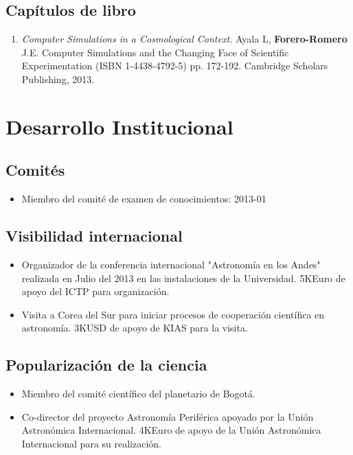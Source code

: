 \documentclass{article}
\begin{document}
\subsection*{Cap\'itulos de libro}
\begin{enumerate}
\item {\it Computer Simulations in a Cosmological Context.} Ayala L, {\bf Forero-Romero} J.E. Computer Simulations and the Changing Face of Scientific Experimentation (ISBN 1-4438-4792-5) pp. 172-192. Cambridge Scholars Publishing, 2013.
\end{enumerate}

\section*{Desarrollo Institucional}

\subsection*{Comit\'es}

\begin{itemize}
\item {Miembro del comit\'e de examen de conocimientos}: 2013-01
\end{itemize}

\subsection*{Visibilidad internacional}

\begin{itemize}
\item {Organizador de la conferencia internacional "Astronom\'ia en los
  Andes" realizada en Julio del 2013 en las instalaciones de la Universidad. 5KEuro de apoyo del ICTP para organizaci\'on.}
\item {Visita a Corea del Sur para iniciar procesos de cooperaci\'on
  cient\'ifica en astronom\'ia. 3KUSD de apoyo de KIAS para la visita.}
\end{itemize}

\subsection*{Popularizaci\'on de la ciencia}
\begin{itemize}
\item {Miembro del comit\'e cient\'ifico del planetario de Bogot\'a.}
\item {Co-director del proyecto Astronom\'ia Perif\'erica apoyado por
  la Uni\'on Astron\'omica Internacional. 4KEuro de apoyo de la Uni\'on Astron\'omica Internacional para su realizaci\'on.}
\end{itemize}
\end{document}

